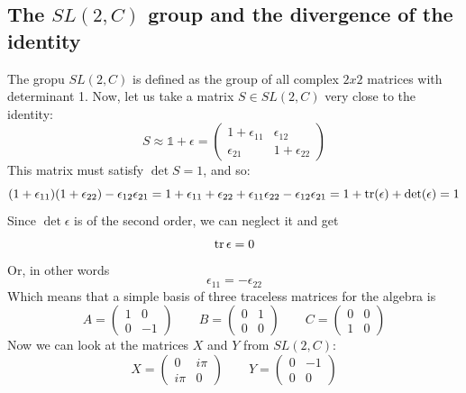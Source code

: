 \documentclass{article}
\begin{document}
\subsection{The $SL(2,C)$ group and the divergence of the identity}
The gropu $SL(2,C)$ is defined as the group of all complex $2x2$ matrices with determinant 1. Now, let us take a matrix $S \in SL(2, C)$ very close to the identity:
\begin{equation}
    S \approx \mathbb{1} + \epsilon = \begin{pmatrix}
        1 + \epsilon_{11} & \epsilon_{12} \\ \epsilon_{21} & 1 + \epsilon_{22}
    \end{pmatrix}
\end{equation}
This matrix must satisfy $\det S = 1$, and so:
\begin{equation}
    (1 + \epsilon_{11})(1 + \epsilon_{22}) - \epsilon_{12}\epsilon_{21} = 1 + \epsilon_{11} + \epsilon_{22} + \epsilon_{11}\epsilon_{22} - \epsilon_{12}\epsilon_{21} = 1 + \tr(\epsilon) + \det(\epsilon) = 1
\end{equation}
Since $\det \epsilon$ is of the second order, we can neglect it and get
\begin{equation}
    \tr \epsilon = 0
\end{equation}
Or, in other words
\begin{equation}
    \epsilon_{11} = -\epsilon_{22}
\end{equation}
Which means that a simple basis of three traceless matrices for the algebra is
\begin{equation}
    A = \begin{pmatrix}1 & 0 \\ 0 & -1\end{pmatrix}
    \qquad
    B = \begin{pmatrix}0 & 1 \\ 0 & 0\end{pmatrix}
    \qquad
    C = \begin{pmatrix}0 & 0 \\ 1 & 0\end{pmatrix}
\end{equation}
Now we can look at the matrices $X$ and $Y$ from $SL(2, C)$:
\begin{equation}
    X = \begin{pmatrix}0 & i\pi \\ i\pi & 0\end{pmatrix}
    \qquad
    Y = \begin{pmatrix}0 & -1 \\ 0 & 0\end{pmatrix}
\end{equation}
\end{document}

